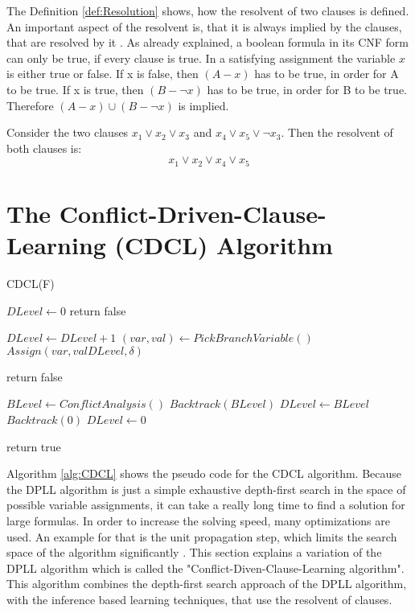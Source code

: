The Definition \ref{def:Resolution} shows, how the resolvent of two clauses is defined. An important aspect of the resolvent is, that it is always implied by the clauses, that are resolved by it \cite{biere2009handbook}. As already explained, a boolean formula in its CNF form can only be true, if every clause is true. In a satisfying assignment the variable $x$ is either true or false. If x is false, then $(A - x)$ has to be true, in order for A to be true. If x is true, then $(B - \neg x)$ has to be true, in order for B to be true. Therefore $(A - x) \cup (B - \neg x)$ is implied.

\begin{leftbar}
Consider the two clauses $x_1 \vee x_2 \vee x_3$ and $x_4 \vee x_5 \vee \neg x_3$. Then the resolvent of both clauses is:
\begin{displaymath}
x_1 \vee x_2 \vee x_4 \vee x_5
\end{displaymath}
\end{leftbar}

\section{The Conflict-Driven-Clause-Learning (CDCL) Algorithm}
\label{sec:cdcl}

\begin{algorithm}
\caption{CDCL(F) \cite{biere2009handbook}}\label{alg:CDCL}
\begin{algorithmic}
\State $DLevel \gets 0$
	\State return false
\EndIf

	\State $DLevel \gets DLevel + 1$
	\State $(var, val) \gets PickBranchVariable()$
	\State $Assign(var, val DLevel, \delta)$
	
			\State return false
		\EndIf
	
	
		\State $BLevel \gets ConflictAnalysis()$
		\State $Backtrack(BLevel)$
		\State $DLevel \gets BLevel$
			\State $Backtrack(0)$
			\State $DLevel \gets 0$
		\EndIf
	\EndWhile
\EndWhile

\State return true

\end{algorithmic}
\end{algorithm}

Algorithm \ref{alg:CDCL} \cite{biere2009handbook} shows the pseudo code for the CDCL algorithm. Because the DPLL algorithm is just a simple exhaustive depth-first search in the space of possible variable assignments, it can take a really long time to find a solution for large formulas. In order to increase the solving speed, many optimizations are used. An example for that is the unit propagation step, which limits the search space of the algorithm significantly \cite{biere2009handbook}. This section explains a variation of the DPLL algorithm which is called the "Conflict-Diven-Clause-Learning algorithm". This algorithm combines the depth-first search approach of the DPLL algorithm, with the inference based learning techniques, that use the resolvent of clauses. \cite{biere2009handbook}

